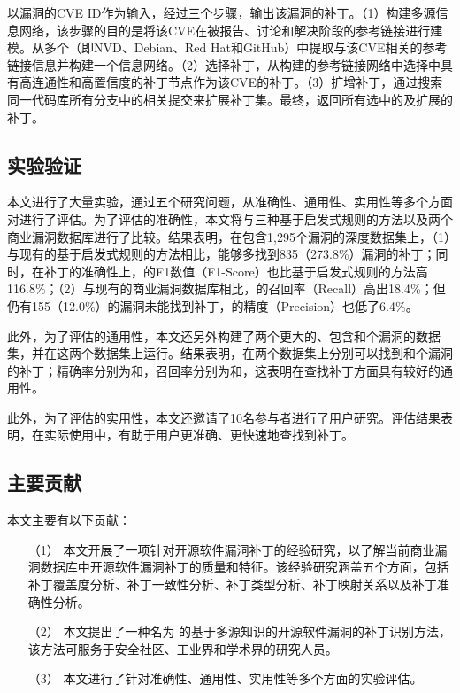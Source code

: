 \tool 以漏洞的CVE ID作为输入，经过三个步骤，输出该漏洞的补丁。（1）构建多源信息网络，该步骤的目的是将该CVE在被报告、讨论和解决阶段的参考链接进行建模。\tool 从多个（即NVD、Debian、Red Hat和GitHub）中提取与该CVE相关的参考链接信息并构建一个信息网络。（2）选择补丁，\tool 从构建的参考链接网络中选择中具有高连通性和高置信度的补丁节点作为该CVE的补丁。（3）扩增补丁，\tool 通过搜索同一代码库所有分支中的相关提交来扩展补丁集。最终，返回所有选中的及扩展的补丁。

\subsection{实验验证}
本文进行了大量实验，通过五个研究问题，从准确性、通用性、实用性等多个方面对\tool 进行了评估。为了评估\tool 的准确性，本文将\tool 与三种基于启发式规则的方法以及两个商业漏洞数据库进行了比较。结果表明，在包含1,295个漏洞的深度数据集上，（1）与现有的基于启发式规则的方法相比，\tool 能够多找到835（273.8\%）漏洞的补丁；同时，在补丁的准确性上，\tool 的F1数值（F1-Score）也比基于启发式规则的方法高116.8\%；（2）与现有的商业漏洞数据库相比，\tool 的召回率（Recall）高出18.4\%；但仍有155（12.0\%）的漏洞\tool 未能找到补丁，\tool 的精度（Precision）也低了6.4\%。%

此外，为了评估\tool 的通用性，本文还另外构建了两个更大的、包含和个漏洞的数据集，并在这两个数据集上运行\tool 。结果表明，\tool 在两个数据集上分别可以找到和个漏洞的补丁；精确率分别为和，召回率分别为和，这表明\tool 在查找补丁方面具有较好的通用性。

此外，为了评估\tool 的实用性，本文还邀请了10名参与者进行了用户研究。评估结果表明，在实际使用中，\tool 有助于用户更准确、更快速地查找到补丁。

\subsection{主要贡献}
本文主要有以下贡献：
\begin{enumerate}
\item [（1）]本文开展了一项针对开源软件漏洞补丁的经验研究，以了解当前商业漏洞数据库中开源软件漏洞补丁的质量和特征。该经验研究涵盖五个方面，包括补丁覆盖度分析、补丁一致性分析、补丁类型分析、补丁映射关系以及补丁准确性分析。
\item [（2）]本文提出了一种名为 \tool 的基于多源知识的开源软件漏洞的补丁识别方法，该方法可服务于安全社区、工业界和学术界的研究人员。
\item [（3）]本文进行了针对\tool 准确性、通用性、实用性等多个方面的实验评估。
\end{enumerate}


